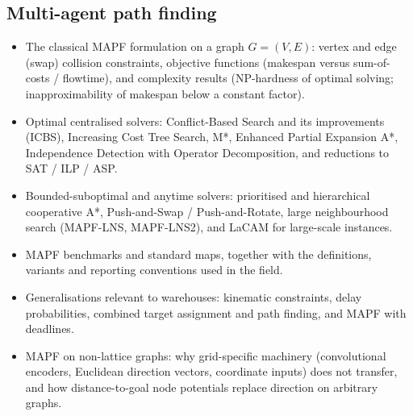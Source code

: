 \subsection{Multi-agent path finding}
\begin{itemize}
  \item The classical MAPF formulation on a graph \( G = (V,E) \):
        vertex and edge (swap) collision constraints, objective functions
        (makespan versus sum-of-costs / flowtime), and complexity results
        (NP-hardness of optimal solving; inapproximability of makespan below
        a constant factor).
  \item Optimal centralised solvers: Conflict-Based Search and its
        improvements (ICBS), Increasing Cost Tree Search, M*, Enhanced
        Partial Expansion A*, Independence Detection with Operator
        Decomposition, and reductions to SAT / ILP / ASP.
  \item Bounded-suboptimal and anytime solvers: prioritised and
        hierarchical cooperative A*, Push-and-Swap / Push-and-Rotate, large
        neighbourhood search (MAPF-LNS, MAPF-LNS2), and LaCAM for
        large-scale instances.
  \item MAPF benchmarks and standard maps, together with the definitions,
        variants and reporting conventions used in the field.
  \item Generalisations relevant to warehouses: kinematic constraints,
        delay probabilities, combined target assignment and path finding,
        and MAPF with deadlines.
  \item MAPF on non-lattice graphs: why grid-specific machinery
        (convolutional encoders, Euclidean direction vectors, coordinate
        inputs) does not transfer, and how distance-to-goal node potentials
        replace direction on arbitrary graphs.
\end{itemize}

